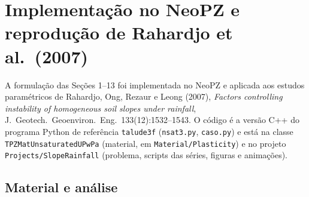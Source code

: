 \section{Implementa\c{c}\~ao no NeoPZ e reprodu\c{c}\~ao de Rahardjo et al.\ (2007)}\label{sec:rahardjo}

\begin{sloppypar}
A formula\c{c}\~ao das Se\c{c}\~oes 1--13 foi implementada no NeoPZ e aplicada aos estudos param\'etricos de
Rahardjo, Ong, Rezaur e Leong (2007), \emph{Factors controlling instability of homogeneous soil slopes under
rainfall}, J.\ Geotech.\ Geoenviron.\ Eng.\ 133(12):1532--1543. O c\'odigo \'e a vers\~ao C++ do programa Python
de refer\^encia \texttt{talude3f} (\texttt{nsat3.py}, \texttt{caso.py}) e est\'a na classe \texttt{TPZMatUnsaturatedUPwPa} (material, em \texttt{Material/Plasticity}) e no projeto
\texttt{Projects/SlopeRainfall} (problema, scripts das s\'eries, figuras e anima\c{c}\~oes).
\end{sloppypar}

\subsection{Material e an\'alise}

